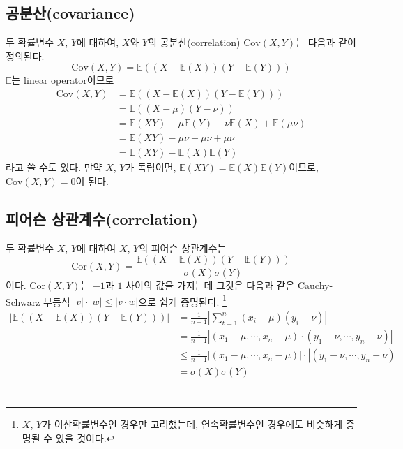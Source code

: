 \documentclass{article}
\begin{document}
\subsection{공분산(covariance)}
두 확률변수 \(X\), \(Y\)에 대하여, \(X\)와 \(Y\)의 공분산(correlation) \(\text{Cov}(X,Y)\)는  다음과 같이 정의된다.
\begin{equation}
\text{Cov}(X,Y)=\mathbb E((X-\mathbb E(X))(Y-\mathbb E(Y)))
\end{equation}
\(\mathbb E\)는 linear operator이므로
\begin{align*}
\text{Cov}(X,Y)
&=\mathbb E((X-\mathbb E(X))(Y-\mathbb E(Y)))\\
&=\mathbb E((X-\mu)(Y-\nu))\\
&=\mathbb E(XY)-\mu\mathbb E(Y)-\nu\mathbb E(X)+\mathbb E(\mu\nu)\\
&=\mathbb E(XY)-\mu\nu-\mu\nu+\mu\nu\\
&=\mathbb E(XY)-\mathbb E(X)\mathbb E(Y)
\end{align*}
라고 쓸 수도 있다.
만약 \(X\), \(Y\)가 독립이면, \(\mathbb E(XY)=\mathbb E(X)\mathbb E(Y)\)이므로, \(\text{Cov}(X,Y)=0\)이 된다.

\subsection{피어슨 상관계수(correlation)}
두 확률변수 \(X\), \(Y\)에 대하여 \(X\), \(Y\)의 피어슨 상관계수는 
\begin{equation}
\text{Cor}(X,Y)=\frac{\mathbb E((X-\mathbb E(X))(Y-\mathbb E(Y)))}{\sigma(X)\sigma(Y)}
\end{equation}
이다.
\(\text{Cor}(X,Y)\)는 \(-1\)과 \(1\) 사이의 값을 가지는데 그것은 다음과 같은 Cauchy-Schwarz 부등식 \(|v|\cdot|w|\le|v\cdot w|\)으로 쉽게 증명된다.
\footnote{\(X\), \(Y\)가 이산확률변수인 경우만 고려했는데, 연속확률변수인 경우에도 비슷하게 증명될 수 있을 것이다.}
\begin{align*}
\left|\mathbb E((X-\mathbb E(X))(Y-\mathbb E(Y)))\right|
&=\frac1{n-1}\left|\sum_{t=1}^n(x_i-\mu)(y_i-\nu)\right|\\
&=\frac1{n-1}\left|(x_1-\mu,\cdots,x_n-\mu)\cdot(y_1-\nu,\cdots,y_n-\nu)\right|\\
&\le\frac1{n-1}\left|(x_1-\mu,\cdots,x_n-\mu)\right|\cdot\left|(y_1-\nu,\cdots,y_n-\nu)\right|\\
&=\sigma(X)\sigma(Y)
\end{align*}

\section{}
\section{}
\section{}
\section{}
\end{document}
